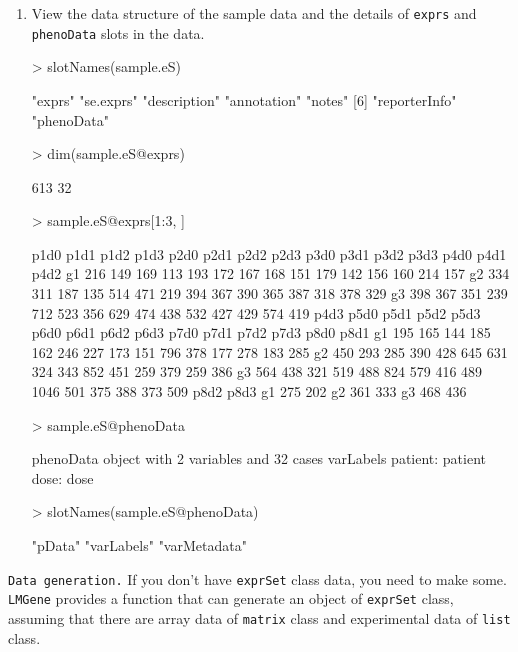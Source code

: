 \documentclass[11pt]{article}
\begin{document}
\begin{enumerate}
\item View the data structure of the sample data and 
the details of {\tt exprs} and {\tt phenoData} slots in the data.
\begin{Schunk}
\begin{Sinput}
> slotNames(sample.eS)
\end{Sinput}
\begin{Soutput}
[1] "exprs"        "se.exprs"     "description"  "annotation"   "notes"       
[6] "reporterInfo" "phenoData"   
\end{Soutput}
\begin{Sinput}
> dim(sample.eS@exprs)
\end{Sinput}
\begin{Soutput}
[1] 613  32
\end{Soutput}
\begin{Sinput}
> sample.eS@exprs[1:3, ]
\end{Sinput}
\begin{Soutput}
   p1d0 p1d1 p1d2 p1d3 p2d0 p2d1 p2d2 p2d3 p3d0 p3d1 p3d2 p3d3 p4d0 p4d1 p4d2
g1  216  149  169  113  193  172  167  168  151  179  142  156  160  214  157
g2  334  311  187  135  514  471  219  394  367  390  365  387  318  378  329
g3  398  367  351  239  712  523  356  629  474  438  532  427  429  574  419
   p4d3 p5d0 p5d1 p5d2 p5d3 p6d0 p6d1 p6d2 p6d3 p7d0 p7d1 p7d2 p7d3 p8d0 p8d1
g1  195  165  144  185  162  246  227  173  151  796  378  177  278  183  285
g2  450  293  285  390  428  645  631  324  343  852  451  259  379  259  386
g3  564  438  321  519  488  824  579  416  489 1046  501  375  388  373  509
   p8d2 p8d3
g1  275  202
g2  361  333
g3  468  436
\end{Soutput}
\begin{Sinput}
> sample.eS@phenoData
\end{Sinput}
\begin{Soutput}
	 phenoData object with 2 variables and 32 cases
	 varLabels
		patient: patient
		dose: dose
\end{Soutput}
\begin{Sinput}
> slotNames(sample.eS@phenoData)
\end{Sinput}
\begin{Soutput}
[1] "pData"       "varLabels"   "varMetadata"
\end{Soutput}
\end{Schunk}

\end{enumerate}

{\tt Data generation.} If you don't have {\tt exprSet} class data, you need to make some.
\texttt{LMGene} provides a function that can generate an object of {\tt exprSet} class,
assuming that there are array data of {\tt matrix} class and experimental data of {\tt list} class.
\end{document}
